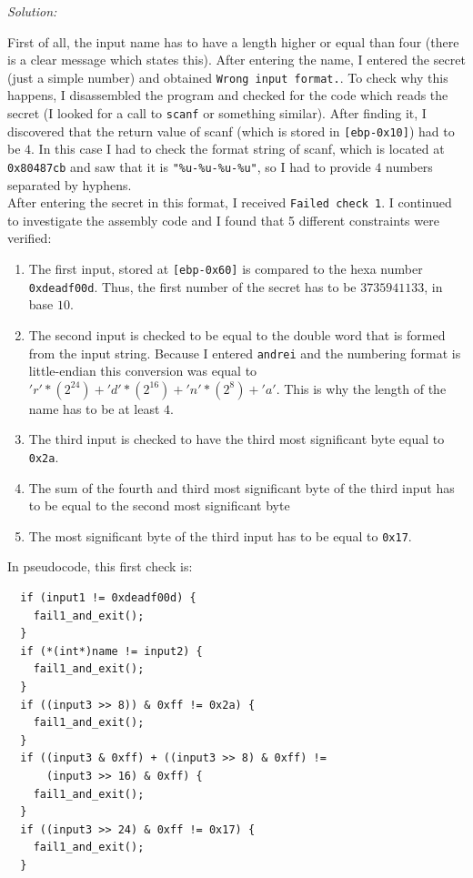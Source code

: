 \documentclass[a4paper,11pt]{article}
\newenvironment{solution}%
{\par{\noindent\small\textit{Solution:}}\vspace{-12pt}\begin{framed}}%
{\end{framed}\par}
\begin{document}
\ifsolution
\begin{solution}
First of all, the input name has to have a length higher or equal than four (there
is a clear message which states this). After entering the name, I entered the secret
(just a simple number) and obtained \texttt{Wrong input format.}. To check why this
happens, I disassembled the program and checked for the code which reads the secret
(I looked for a call to \texttt{scanf} or something similar). After finding it, I
discovered that the return value of scanf (which is stored in \texttt{[ebp-0x10]})
had to be $4$. In this case I had to check the format string of scanf, which is
located at \texttt{0x80487cb} and saw that it is \texttt{"\%u-\%u-\%u-\%u"}, so I
had to provide $4$ numbers separated by hyphens.\\
After entering the secret in this format, I received \texttt{Failed check 1}. I continued
to investigate the assembly code and I found that 5 different constraints were verified:
\begin{enumerate}
  \item The first input, stored at \texttt{[ebp-0x60]} is compared to the hexa number
  \texttt{0xdeadf00d}. Thus, the first number of the secret has to be $3735941133$, in base $10$.
  \item The second input is checked to be equal to the double word that is formed from the input
  string. Because I entered \texttt{andrei} and the numbering format is little-endian this conversion
  was equal to $'r' * (2 ^{24}) + 'd' * (2^{16}) + 'n' * (2^{8}) + 'a'$. This is why the length of the
  name has to be at least $4$.
  \item The third input is checked to have the third most significant byte equal to \texttt{0x2a}.
  \item The sum of the fourth and third most significant byte of the third input has to be equal
  to the second most significant byte
  \item The most significant byte of the third input has to be equal to \texttt{0x17}.
\end{enumerate}

In pseudocode, this first check is:
\begin{lstlisting}
  if (input1 != 0xdeadf00d) {
    fail1_and_exit();
  }
  if (*(int*)name != input2) {
    fail1_and_exit();
  }
  if ((input3 >> 8)) & 0xff != 0x2a) {
    fail1_and_exit();
  }
  if ((input3 & 0xff) + ((input3 >> 8) & 0xff) !=
      (input3 >> 16) & 0xff) {
    fail1_and_exit();
  }
  if ((input3 >> 24) & 0xff != 0x17) {
    fail1_and_exit();
  }
\end{lstlisting}


\end{solution}
\end{document}
